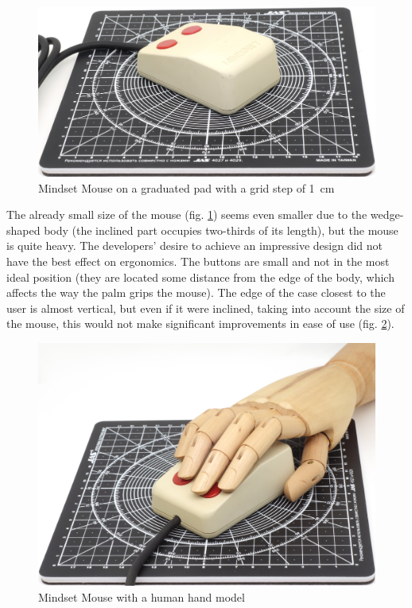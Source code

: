 \documentclass[11pt, a4paper]{article}
\begin{document}
\begin{figure}[h]
    \centering
    \includegraphics[scale=0.5]{1984_mindset_mouse/size_15.jpg}
    \caption{Mindset Mouse on a graduated pad with a grid step of 1~cm}
    \label{fig:MindsetMouseSize}
\end{figure}

The already small size of the mouse (fig. \ref{fig:MindsetMouseSize}) seems even smaller due to the wedge-shaped body (the inclined part occupies two-thirds of its length), but the mouse is quite heavy. The developers' desire to achieve an impressive design did not have the best effect on ergonomics. The buttons are small and not in the most ideal position (they are located some distance from the edge of the body, which affects the way the palm grips the mouse). The edge of the case closest to the user is almost vertical, but even if it were inclined, taking into account the size of the mouse, this would not make significant improvements in ease of use (fig. \ref{fig:MindsetMouseHand}).

\begin{figure}[h]
    \centering
    \includegraphics[scale=0.5]{1984_mindset_mouse/hand_30.jpg}
    \caption{Mindset Mouse with a human hand model}
    \label{fig:MindsetMouseHand}
\end{figure}
\end{document}
